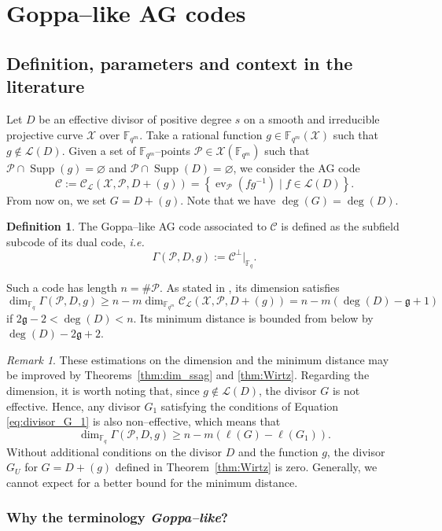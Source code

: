 \documentclass[a4paper]{amsart}
\theoremstyle{definition}
\newtheorem{definition}[thm]{Definition}
\theoremstyle{remark}
\newtheorem{remark}[thm]{Remark}
\DeclareMathOperator{\ev}{ev}
\newcommand{\calP}{\mathcal{P}}
\newcommand{\calL}{\mathcal{L}}
\newcommand{\calC}{\mathcal{C}}
\newcommand{\calX}{\mathcal{X}}
\newcommand{\fqm}{\mathbb{F}_{q^m}}
\newcommand{\fq}{\mathbb{F}_{q}}
\newcommand{\set}[1]{\left\{#1\right\}}
\newcommand{\Supp}{\operatorname{Supp}}
\begin{document}
\section{Goppa--like AG codes}\label{sec:Goppa}
\subsection{Definition, parameters and context in the literature}\label{subsec:def-Goppa}

Let $D$ be an effective divisor of positive degree $s$ on a smooth and irreducible projective curve $\calX$ over $\fqm$. Take a rational function $g \in \fqm(\calX)$ such that $g \notin \calL(D)$. Given a set of $\fqm$--points $\calP \in \calX(\fqm)$ such that $\calP \cap \Supp(g) = \varnothing$ and $\calP \cap \Supp(D) = \varnothing$, we consider the AG code
\[\calC := \calC_{\calL}(\calX,\calP,D+(g))=\set{\ev_{\calP}(fg^{-1}) \mid f \in \calL(D)}.\]
From now on, we set $G=D+(g)$. Note that we have $\deg(G)=\deg(D)$.
\begin{definition} \label{def:Goppa--like_AG_code}
The Goppa--like AG code associated to $\calC$ is defined as the subfield subcode of its dual code, \emph{i.e.}
\[ \Gamma(\calP,D,g) := \calC^{\perp}|_{\fq}.\]
\end{definition}%
%
Such a code has length $n = \# \calP$. As stated in \cite[Theorem~1]{JM96}, its dimension satisfies 
\[\dim_{\fq} \Gamma(\calP,D,g) \geq n-m \dim_{\fqm} \calC_{\calL}(\calX,\calP,D+(g)) =n-m(\deg (D) - \mathfrak{g} +1 )\]
if $2\mathfrak{g} - 2 < \deg (D) < n$. Its minimum distance is bounded from below by $\deg (D) - 2 \mathfrak{g} + 2$.

\begin{remark}
These estimations on the dimension and the minimum distance may be improved by Theorems~\ref{thm:dim_ssag} and \ref{thm:Wirtz}. Regarding the dimension, it is worth noting that, since $g \notin \calL(D)$, the divisor $G$ is not effective. Hence, any divisor $G_1$ satisfying the conditions of Equation \eqref{eq:divisor_G_1} is also non--effective, which means that
\[	\dim_{\fq}  \Gamma(\calP,D,g) \geq 	n-m\left(\ell(G) - \ell(G_1)\right). \]
Without additional conditions on the divisor $D$ and the function $g$, the divisor $G_U$ for $G=D+(g)$ defined in Theorem~\ref{thm:Wirtz} is zero. Generally, we cannot expect for a better bound for the minimum distance. 
\end{remark}



\subsubsection{Why the terminology \textit{Goppa--like}?}
\end{document}

